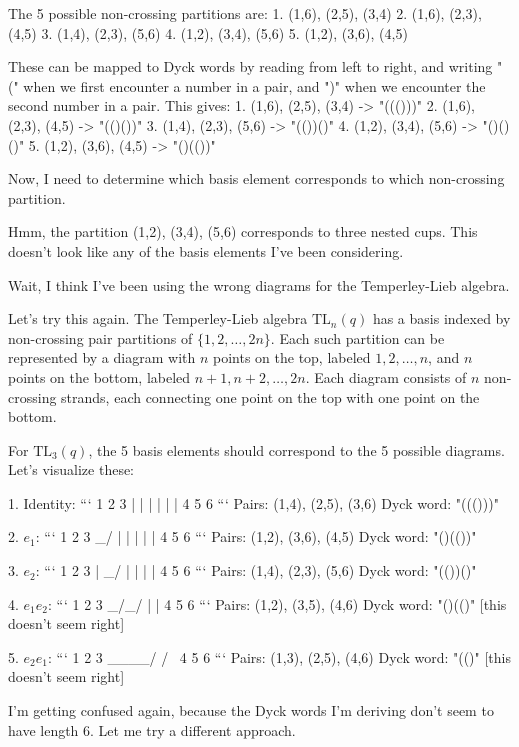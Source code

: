 \documentclass[12p]{article}
\newcounter{reasoningcounter}
\newenvironment{reasoning}[1][]
{\refstepcounter{reasoningcounter}%
\begin{tcolorbox}[
    title=Reasoning \thereasoningcounter: #1,
    colback=white, %
    colframe=gray,
    coltext=black, %
    fonttitle=\bfseries\normalsize,
    top=2mm,
    bottom=2mm,
    enlarge top initially by=5mm
]
\small
}
{\end{tcolorbox}}
\begin{document}
\begin{reasoning}
The 5 possible non-crossing partitions are:
1. {(1,6), (2,5), (3,4)}
2. {(1,6), (2,3), (4,5)}
3. {(1,4), (2,3), (5,6)}
4. {(1,2), (3,4), (5,6)}
5. {(1,2), (3,6), (4,5)}

These can be mapped to Dyck words by reading from left to right, and writing "(" when we first encounter a number in a pair, and ")" when we encounter the second number in a pair. This gives:
1. {(1,6), (2,5), (3,4)} -> "((()))"
2. {(1,6), (2,3), (4,5)} -> "(()())"
3. {(1,4), (2,3), (5,6)} -> "(())()"
4. {(1,2), (3,4), (5,6)} -> "()()()"
5. {(1,2), (3,6), (4,5)} -> "()(())"

Now, I need to determine which basis element corresponds to which non-crossing partition.

Hmm, the partition {(1,2), (3,4), (5,6)} corresponds to three nested cups. This doesn't look like any of the basis elements I've been considering.

Wait, I think I've been using the wrong diagrams for the Temperley-Lieb algebra. 

Let's try this again. The Temperley-Lieb algebra $\text{TL}_n(q)$ has a basis indexed by non-crossing pair partitions of $\{1, 2, \ldots, 2n\}$. Each such partition can be represented by a diagram with $n$ points on the top, labeled $1, 2, \ldots, n$, and $n$ points on the bottom, labeled $n+1, n+2, \ldots, 2n$. Each diagram consists of $n$ non-crossing strands, each connecting one point on the top with one point on the bottom.

For $\text{TL}_3(q)$, the 5 basis elements should correspond to the 5 possible diagrams. Let's visualize these:

1. Identity:
```
1   2   3
|   |   |
|   |   |
4   5   6
```
Pairs: {(1,4), (2,5), (3,6)}
Dyck word: "((()))"

2. $e_1$:
```
1   2   3
 \_/   |
    |   |
    |   |
4   5   6
```
Pairs: {(1,2), (3,6), (4,5)}
Dyck word: "()(())"

3. $e_2$:
```
1   2   3
|    \_/
|   |
|   |
4   5   6
```
Pairs: {(1,4), (2,3), (5,6)}
Dyck word: "(())()"

4. $e_1 e_2$:
```
1   2   3
 \_/\_/
      |
      |
4   5   6
```
Pairs: {(1,2), (3,5), (4,6)}
Dyck word: "()(()" [this doesn't seem right]

5. $e_2 e_1$:
```
1   2   3
 \____/
/      \
4   5   6
```
Pairs: {(1,3), (2,5), (4,6)}
Dyck word: "(()" [this doesn't seem right]

I'm getting confused again, because the Dyck words I'm deriving don't seem to have length 6. Let me try a different approach.


\end{reasoning}
\end{document}

